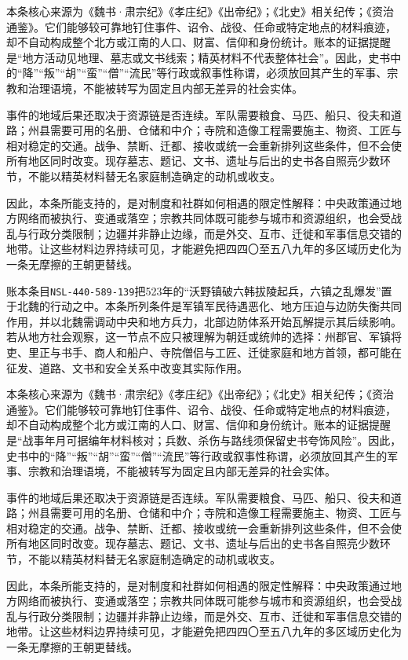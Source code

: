 本条核心来源为《魏书·肃宗纪》《孝庄纪》《出帝纪》；《北史》相关纪传；《资治通鉴》。它们能够较可靠地钉住事件、诏令、战役、任命或特定地点的材料痕迹，却不自动构成整个北方或江南的人口、财富、信仰和身份统计。账本的证据提醒是“地方活动见地理、墓志或文书线索；精英材料不代表整体社会”。因此，史书中的“降”“叛”“胡”“蛮”“僧”“流民”等行政或叙事性称谓，必须放回其产生的军事、宗教和治理语境，不能被转写为固定且内部无差异的社会实体。

事件的地域后果还取决于资源链是否连续。军队需要粮食、马匹、船只、役夫和道路；州县需要可用的名册、仓储和中介；寺院和造像工程需要施主、物资、工匠与相对稳定的交通。战争、禁断、迁都、接收或统一会重新排列这些条件，但不会使所有地区同时改变。现存墓志、题记、文书、遗址与后出的史书各自照亮少数环节，不能以精英材料替无名家庭制造确定的动机或收支。

因此，本条所能支持的，是对制度和社群如何相遇的限定性解释：中央政策通过地方网络而被执行、变通或落空；宗教共同体既可能参与城市和资源组织，也会受战乱与行政分类限制；边疆并非静止边缘，而是外交、互市、迁徙和军事信息交错的地带。让这些材料边界持续可见，才能避免把四四〇至五八九年的多区域历史化为一条无摩擦的王朝更替线。

账本条目\texttt{NSL-440-589-139}把523年的“沃野镇破六韩拔陵起兵，六镇之乱爆发”置于北魏的行动之中。本条所列条件是军镇军民待遇恶化、地方压迫与边防失衡共同作用，并以北魏需调动中央和地方兵力，北部边防体系开始瓦解提示其后续影响。若从地方社会观察，这一节点不应只被理解为朝廷或统帅的选择：州郡官、军镇将吏、里正与书手、商人和船户、寺院僧侣与工匠、迁徙家庭和地方首领，都可能在征发、道路、文书和安全关系中改变其实际作用。

本条核心来源为《魏书·肃宗纪》《孝庄纪》《出帝纪》；《北史》相关纪传；《资治通鉴》。它们能够较可靠地钉住事件、诏令、战役、任命或特定地点的材料痕迹，却不自动构成整个北方或江南的人口、财富、信仰和身份统计。账本的证据提醒是“战事年月可据编年材料核对；兵数、杀伤与路线须保留史书夸饰风险”。因此，史书中的“降”“叛”“胡”“蛮”“僧”“流民”等行政或叙事性称谓，必须放回其产生的军事、宗教和治理语境，不能被转写为固定且内部无差异的社会实体。

事件的地域后果还取决于资源链是否连续。军队需要粮食、马匹、船只、役夫和道路；州县需要可用的名册、仓储和中介；寺院和造像工程需要施主、物资、工匠与相对稳定的交通。战争、禁断、迁都、接收或统一会重新排列这些条件，但不会使所有地区同时改变。现存墓志、题记、文书、遗址与后出的史书各自照亮少数环节，不能以精英材料替无名家庭制造确定的动机或收支。

因此，本条所能支持的，是对制度和社群如何相遇的限定性解释：中央政策通过地方网络而被执行、变通或落空；宗教共同体既可能参与城市和资源组织，也会受战乱与行政分类限制；边疆并非静止边缘，而是外交、互市、迁徙和军事信息交错的地带。让这些材料边界持续可见，才能避免把四四〇至五八九年的多区域历史化为一条无摩擦的王朝更替线。

